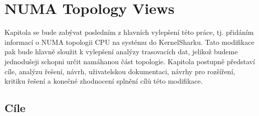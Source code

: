 \chapter{NUMA Topology Views}
Kapitola se bude zabývat posledním z hlavních vylepšení této práce, tj. přidáním informací o NUMA topologii CPU na systému do KernelSharku. Tato modifikace pak bude hlavně sloužit k vylepšení analýzy trasovacích dat, jelikož budeme jednodušeji schopni určit namáhanou část topologie. Kapitola postupně představí cíle, analýzu řešení, návrh, uživatelskou dokumentaci, návrhy pro rozšíření, kritiku řešení a konečné zhodnocení splnění cílů této modifikace.

\section{Cíle}

